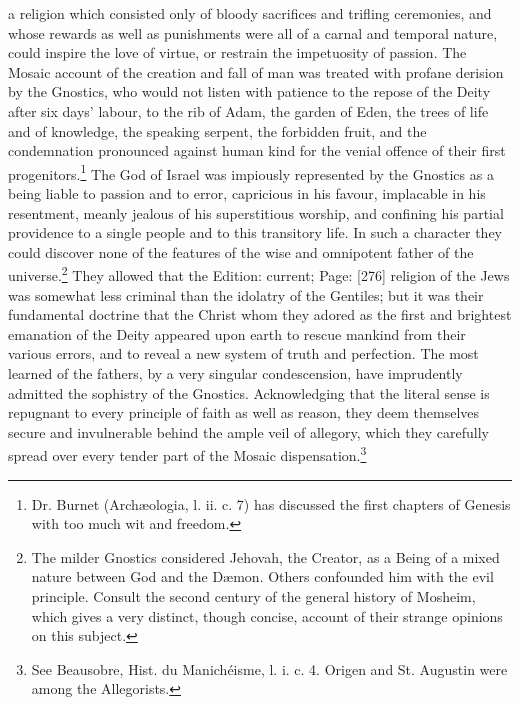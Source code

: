 a religion which consisted only of bloody sacrifices and trifling ceremonies, and whose rewards as well as punishments were all of a carnal and temporal nature, could inspire the love of virtue, or restrain the impetuosity of passion. The Mosaic account of the creation and fall of man was treated with profane derision by the Gnostics, who would not listen with patience to the repose of the Deity after six days\texthebrew{}’ labour, to the rib of Adam, the garden of Eden, the trees of life and of knowledge, the speaking serpent, the forbidden fruit, and the condemnation pronounced against human kind for the venial offence of their first progenitors.\footnote{Dr. Burnet (Archæologia, l. ii. c. 7) has discussed the first chapters of Genesis with too much wit and freedom.} The God of Israel was impiously represented by the Gnostics as a being liable to passion and to error, capricious in his favour, implacable in his resentment, meanly jealous of his superstitious worship, and confining his partial providence to a single people and to this transitory life. In such a character they could discover none of the features of the wise and omnipotent father of the universe.\footnote{The milder Gnostics considered Jehovah, the Creator, as a Being of a mixed nature between God and the Dæmon. Others confounded him with the evil principle. Consult the second century of the general history of Mosheim, which gives a very distinct, though concise, account of their strange opinions on this subject.} They allowed that the Edition: current; Page: [276] religion of the Jews was somewhat less criminal than the idolatry of the Gentiles; but it was their fundamental doctrine that the Christ whom they adored as the first and brightest emanation of the Deity appeared upon earth to rescue mankind from their various errors, and to reveal a new system of truth and perfection. The most learned of the fathers, by a very singular condescension, have imprudently admitted the sophistry of the Gnostics. Acknowledging that the literal sense is repugnant to every principle of faith as well as reason, they deem themselves secure and invulnerable behind the ample veil of allegory, which they carefully spread over every tender part of the Mosaic dispensation.\footnote{See Beausobre, Hist. du Manichéisme, l. i. c. 4. Origen and St. Augustin were among the Allegorists.}

